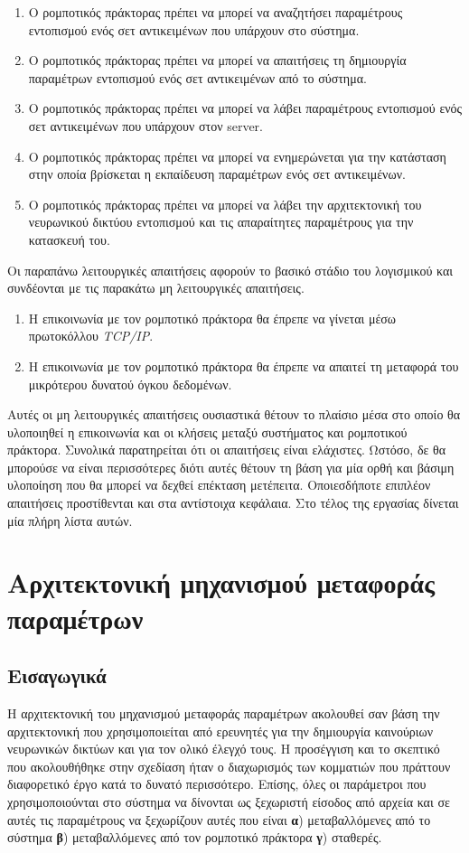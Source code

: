 \begin{enumerate}
    \item Ο ρομποτικός πράκτορας πρέπει να μπορεί να αναζητήσει παραμέτρους εντοπισμού ενός σετ αντικειμένων που υπάρχουν στο σύστημα.
    \item Ο ρομποτικός πράκτορας πρέπει να μπορεί να απαιτήσεις τη δημιουργία παραμέτρων εντοπισμού ενός σετ αντικειμένων από το σύστημα.
    \item Ο ρομποτικός πράκτορας πρέπει να μπορεί να λάβει παραμέτρους εντοπισμού ενός σετ αντικειμένων που υπάρχουν στον server.
    \item Ο ρομποτικός πράκτορας πρέπει να μπορεί να ενημερώνεται για την κατάσταση στην οποία βρίσκεται η εκπαίδευση παραμέτρων ενός σετ αντικειμένων.
    \item Ο ρομποτικός πράκτορας πρέπει να μπορεί να λάβει την αρχιτεκτονική του νευρωνικού δικτύου εντοπισμού και τις απαραίτητες παραμέτρους για την κατασκευή του.
\end{enumerate}
 
Οι παραπάνω λειτουργικές απαιτήσεις αφορούν το βασικό στάδιο του λογισμικού και συνδέονται με τις παρακάτω μη λειτουργικές απαιτήσεις.
\begin{enumerate}
    \item Η επικοινωνία με τον ρομποτικό πράκτορα θα έπρεπε να γίνεται μέσω πρωτοκόλλου \textit{TCP/IP}.
    \item Η επικοινωνία με τον ρομποτικό πράκτορα θα έπρεπε να απαιτεί τη μεταφορά του μικρότερου δυνατού όγκου δεδομένων.
\end{enumerate}

Αυτές οι μη λειτουργικές απαιτήσεις ουσιαστικά θέτουν το πλαίσιο μέσα στο οποίο θα υλοποιηθεί η επικοινωνία και οι κλήσεις μεταξύ συστήματος και ρομποτικού πράκτορα. Συνολικά παρατηρείται ότι οι απαιτήσεις είναι ελάχιστες. Ωστόσο, δε θα μπορούσε να είναι περισσότερες διότι αυτές θέτουν τη βάση για μία ορθή και βάσιμη υλοποίηση που θα μπορεί να δεχθεί επέκταση μετέπειτα. Οποιεσδήποτε επιπλέον απαιτήσεις προστίθενται και στα αντίστοιχα κεφάλαια. Στο τέλος της εργασίας δίνεται μία πλήρη λίστα αυτών.

\section{Αρχιτεκτονική μηχανισμού μεταφοράς παραμέτρων}
\subsection{Εισαγωγικά}
Η αρχιτεκτονική του μηχανισμού μεταφοράς παραμέτρων ακολουθεί σαν βάση την αρχιτεκτονική που χρησιμοποιείται από ερευνητές για την δημιουργία καινούριων νευρωνικών δικτύων και για τον ολικό έλεγχό τους. Η προσέγγιση και το σκεπτικό που ακολουθήθηκε στην σχεδίαση ήταν ο διαχωρισμός των κομματιών που πράττουν διαφορετικό έργο κατά το δυνατό περισσότερο. Επίσης, όλες οι παράμετροι που χρησιμοποιούνται στο σύστημα να δίνονται ως ξεχωριστή είσοδος από αρχεία και σε αυτές τις παραμέτρους να ξεχωρίζουν αυτές που είναι \textbf{α}) μεταβαλλόμενες από το σύστημα \textbf{β}) μεταβαλλόμενες από τον ρομποτικό πράκτορα \textbf{γ}) σταθερές.

